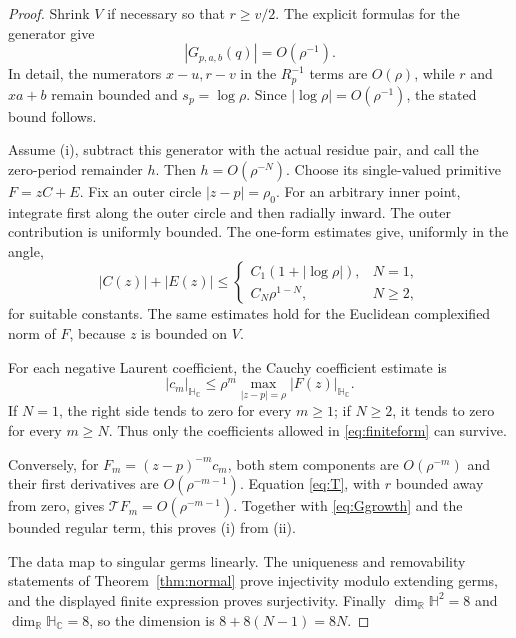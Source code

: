 \documentclass[11pt,a4paper]{article}
\numberwithin{equation}{section}
\theoremstyle{definition}
\theoremstyle{remark}
\newcommand{\R}{\mathbb R}
\newcommand{\C}{\mathbb C}
\newcommand{\HH}{\mathbb H}
\newcommand{\HC}{\mathbb H_{\C}}
\newcommand{\T}{\mathcal T}
\begin{document}
\begin{proof}
Shrink $V$ if necessary so that $r\ge v/2$. The explicit formulas for the
generator give
\begin{equation}
 |G_{p,a,b}(q)|=O(\rho^{-1}).
 \label{eq:Ggrowth}
\end{equation}
In detail, the numerators $x-u,r-v$ in the $R_p^{-1}$ terms are
$O(\rho)$, while $r$ and $xa+b$ remain bounded and
$s_p=\log\rho$. Since $|\log\rho|=O(\rho^{-1})$, the stated bound follows.

Assume (i), subtract this generator with the actual residue pair, and call
the zero-period remainder $h$. Then $h=O(\rho^{-N})$. Choose its
single-valued primitive $F=zC+E$. Fix an outer circle
$|z-p|=\rho_0$. For an arbitrary inner point, integrate first along the
outer circle and then radially inward. The outer contribution is uniformly
bounded. The one-form estimates give, uniformly in the angle,
\begin{equation}
 |C(z)|+|E(z)|\le
 \begin{cases}
  C_1(1+|\log\rho|),&N=1,\\
  C_N\rho^{1-N},&N\ge2,
 \end{cases}
 \label{eq:primitivegrowth}
\end{equation}
for suitable constants. The same estimates hold for the Euclidean
complexified norm of $F$, because $z$ is bounded on $V$.

For each negative Laurent coefficient, the Cauchy coefficient estimate is
\[
 |c_m|_{\HC}\le \rho^m\max_{|z-p|=\rho}|F(z)|_{\HC}.
\]
If $N=1$, the right side tends to zero for every $m\ge1$; if $N\ge2$,
it tends to zero for every $m\ge N$. Thus only the coefficients allowed in
\eqref{eq:finiteform} can survive.

Conversely, for $F_m=(z-p)^{-m}c_m$, both stem components are
$O(\rho^{-m})$ and their first derivatives are $O(\rho^{-m-1})$.
Equation \eqref{eq:T}, with $r$ bounded away from zero, gives
$\T F_m=O(\rho^{-m-1})$. Together with \eqref{eq:Ggrowth} and the bounded
regular term, this proves (i) from (ii).

The data map to singular germs linearly. The uniqueness and removability
statements of Theorem~\ref{thm:normal} prove injectivity modulo extending
germs, and the displayed finite expression proves surjectivity.
Finally $\dim_\R\HH^2=8$ and $\dim_\R\HC=8$, so the dimension is
$8+8(N-1)=8N$.
\end{proof}
\end{document}

